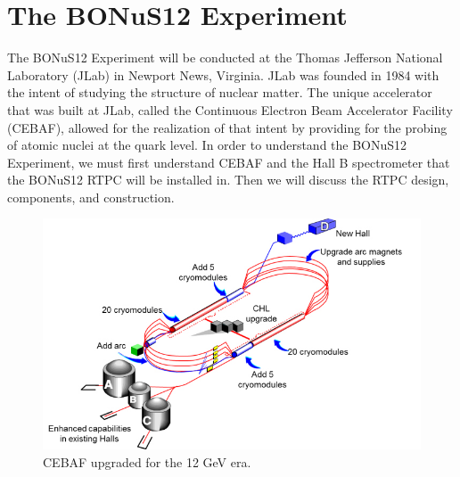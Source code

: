 \chapter{The BONuS12 Experiment}
\label{ch:bonus}
The BONuS12 Experiment will be conducted at the Thomas Jefferson National Laboratory (JLab) in Newport News, Virginia. JLab was founded in 1984 with the intent of studying the structure of nuclear matter. The unique accelerator that was built at JLab, called the Continuous Electron Beam Accelerator Facility (CEBAF), allowed for the realization of that intent by providing for the probing of atomic nuclei at the quark level. In order to understand the BONuS12 Experiment, we must first understand CEBAF and the Hall B spectrometer that the BONuS12 RTPC will be installed in. Then we will discuss the RTPC design, components, and construction.

\begin{figure}[h!]
	\centering
	\includegraphics[width=0.8\linewidth]{figures/cebaf.png}
	\caption{CEBAF upgraded for the 12 GeV era.}
	\label{fig:cebaf}
\end{figure}

